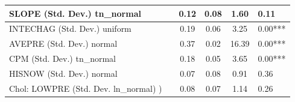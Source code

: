 \begin{table}
\begin{center}
\begin{tabular}{|l|l|c|c|c|l|}
			\hline
			SLOPE (Std. Dev.) tn_normal &  & 0.12 & 0.08 & 1.60 & 0.11 \\
			\hline
			INTECHAG (Std. Dev.) uniform &  & 0.19 & 0.06 & 3.25 & 0.00*** \\
			\hline
			AVEPRE (Std. Dev.) normal &  & 0.37 & 0.02 & 16.39 & 0.00*** \\
			\hline
			CPM (Std. Dev.) tn_normal &  & 0.18 & 0.05 & 3.65 & 0.00*** \\
			\hline
			HISNOW (Std. Dev.) normal &  & 0.07 & 0.08 & 0.91 & 0.36 \\
			\hline
			 Chol: LOWPRE (Std. Dev. ln_normal) ) &  & 0.08 & 0.07 & 1.14 & 0.26 \\
			\hline
		\end{tabular}
	\end{center}
\end{table}